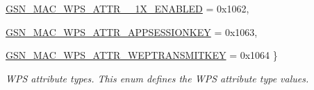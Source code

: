 \begin{DoxyCompactItemize}
\par
\hyperlink{a00642_gga0ae19d69a0b381d883890df8a7812414a2dcc37ccc4d028268022fb606db04ada}{GSN\_\-MAC\_\-WPS\_\-ATTR\_\_\-1X\_\-ENABLED} =  0x1062, 
\par
\hyperlink{a00642_gga0ae19d69a0b381d883890df8a7812414a83c9a15823fc1f9759c87d8f8c88746b}{GSN\_\-MAC\_\-WPS\_\-ATTR\_\-APPSESSIONKEY} =  0x1063, 
\par
\hyperlink{a00642_gga0ae19d69a0b381d883890df8a7812414a89a728e5656f62fe81a5263adcbdf6e0}{GSN\_\-MAC\_\-WPS\_\-ATTR\_\-WEPTRANSMITKEY} =  0x1064
 \}
\begin{DoxyCompactList}\small\item\em WPS attribute types. This enum defines the WPS attribute type values. \end{DoxyCompactList}\end{DoxyCompactItemize}
